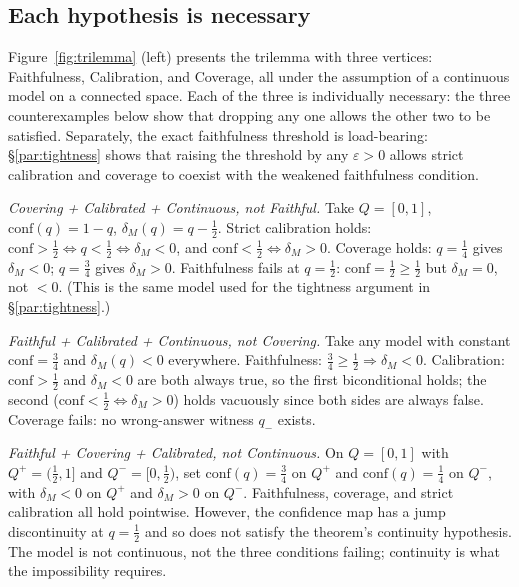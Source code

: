 \documentclass[10pt]{article}
\newcommand{\conf}{\mathrm{conf}}
\begin{document}
\subsection{Each hypothesis is necessary}
\label{sec:counterexamples}

Figure~\ref{fig:trilemma} (left) presents the trilemma with three vertices:
Faithfulness, Calibration, and Coverage, all under the assumption
of a continuous model on a connected space. Each of the three is individually necessary: the
three counterexamples below show that dropping any one allows the other
two to be satisfied. Separately, the exact faithfulness threshold is
load-bearing: \S\ref{par:tightness} shows that raising the threshold by any
$\varepsilon > 0$ allows strict calibration and coverage to coexist with the
weakened faithfulness condition.

\smallskip
\noindent\textit{Covering + Calibrated + Continuous, not Faithful.}
Take $Q = [0,1]$, $\conf(q) = 1 - q$, $\delta_M(q) = q - \tfrac{1}{2}$.
Strict calibration holds: $\conf > \tfrac{1}{2} \iff q < \tfrac{1}{2}
\iff \delta_M < 0$, and $\conf < \tfrac{1}{2} \iff \delta_M > 0$.
Coverage holds: $q = \tfrac{1}{4}$ gives $\delta_M < 0$; $q = \tfrac{3}{4}$
gives $\delta_M > 0$. Faithfulness fails at $q = \tfrac{1}{2}$: $\conf =
\tfrac{1}{2} \geq \tfrac{1}{2}$ but $\delta_M = 0$, not $< 0$.
(This is the same model used for the tightness argument in
\S\ref{par:tightness}.)

\smallskip
\noindent\textit{Faithful + Calibrated + Continuous, not Covering.}
Take any model with constant $\conf = \tfrac{3}{4}$ and $\delta_M(q) < 0$
everywhere. Faithfulness: $\tfrac{3}{4} \geq \tfrac{1}{2} \Rightarrow \delta_M
< 0$. Calibration: $\conf > \tfrac{1}{2}$ and $\delta_M < 0$ are both always
true, so the first biconditional holds; the second ($\conf < \tfrac{1}{2}
\iff \delta_M > 0$) holds vacuously since both sides are always false.
Coverage fails: no wrong-answer witness $q_-$ exists.

\smallskip
\noindent\textit{Faithful + Covering + Calibrated, not Continuous.}
On $Q = [0,1]$ with $Q^+ = (\tfrac{1}{2},1]$ and $Q^- = [0,\tfrac{1}{2})$,
set $\conf(q) = \tfrac{3}{4}$ on $Q^+$ and $\conf(q) = \tfrac{1}{4}$ on
$Q^-$, with $\delta_M < 0$ on $Q^+$ and $\delta_M > 0$ on $Q^-$.
Faithfulness, coverage, and strict calibration all hold pointwise. However,
the confidence map has a jump discontinuity at $q = \tfrac{1}{2}$ and so
does not satisfy the theorem's continuity hypothesis. The model is not
continuous, not the three conditions failing; continuity is what the
impossibility requires.
\end{document}
